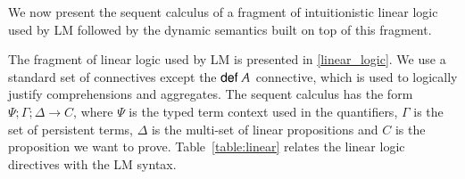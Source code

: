 
\newcommand{\mz}{\m{match} \;}
\newcommand{\tab}[0]{\;\;\;\;}
\newcommand{\dz}{\m{derive} \;}
\newcommand{\comp}[0]{\m{comp} \;}
\newcommand{\az}{\m{apply} \;}
\newcommand{\doz}{\m{run} \;}
\newcommand{\seqnocut}[3]{#1 ; #2 \Rightarrow #3}
\newcommand{\defeq}{\buildrel\triangle\over =}
\newcommand{\compr}[1]{\m{def} \; #1}

\newcommand{\mo}{\m{match}_{LLD} \;}
\newcommand{\cont}{\m{cont}_{LLD} \;}
\newcommand{\contc}{\m{cont}_{LLDc} \;}
\newcommand{\done}{\m{derive}_{LLD} \;}
\newcommand{\doo}{\m{run}_{LLD} \;}
\newcommand{\mc}[0]{\m{match}_{LLDc} \; }
\newcommand{\dall}[0]{\m{fix}_{LLD} \; }
\newcommand{\strans}[0]{\m{update}_{LLD} \;}
\newcommand{\dc}{\m{derive}_{LLDc} \;}
\newcommand{\ao}{\m{apply}_{LLD} \;}

We now present the sequent calculus of a fragment of intuitionistic linear
logic~\cite{girard-87} used by LM followed by the dynamic semantics built on top of
this fragment.

The fragment of linear logic used by LM is presented in \ref{linear_logic}.
We use a standard set of connectives except the $\mathsf{def} \; A$ connective, which is used to logically justify comprehensions and aggregates.
The sequent calculus has the form $\Psi; \Gamma; \Delta \rightarrow C$, where $\Psi$ is the typed term context used in the quantifiers, $\Gamma$ is the set
of persistent terms, $\Delta$ is the multi-set of linear propositions and $C$ is the proposition we want to prove.
Table~\ref{table:linear} relates the linear logic directives with the LM syntax.


